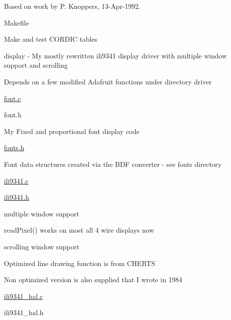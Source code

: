 \begin{DoxyItemize}
\begin{DoxyItemize}
\begin{DoxyItemize}
\begin{DoxyItemize}
\item Based on work by P. Knoppers, 13-\/\+Apr-\/1992.
\end{DoxyItemize}
\item Makefile
\begin{DoxyItemize}
\item Make and test C\+O\+R\+D\+IC tables
\end{DoxyItemize}
\end{DoxyItemize}
\end{DoxyItemize}
\item display -\/ My mostly rewritten ili9341 display driver with multiple window support and scrolling
\begin{DoxyItemize}
\item Depends on a few modified Adafruit functions under directory driver
\begin{DoxyItemize}
\item \hyperlink{font_8c}{font.\+c}
\item font.\+h
\begin{DoxyItemize}
\item My Fixed and proportional font display code
\end{DoxyItemize}
\item \hyperlink{fonts_8h}{fonts.\+h}
\begin{DoxyItemize}
\item Font data structures created via the B\+DF converter -\/ see fonts directory
\end{DoxyItemize}
\item \hyperlink{ili9341_8c}{ili9341.\+c}
\item \hyperlink{ili9341_8h}{ili9341.\+h}
\begin{DoxyItemize}
\item multiple window support
\item read\+Pixel() works on most all 4 wire displays now
\item scrolling window support
\item Optimized line drawing function is from C\+H\+E\+R\+TS
\begin{DoxyItemize}
\item Non optimized version is also supplied that I wrote in 1984
\end{DoxyItemize}
\end{DoxyItemize}
\item \hyperlink{ili9341__hal_8c}{ili9341\+\_\+hal.\+c}
\item ili9341\+\_\+hal.\+h
\begin{DoxyItemize}

\end{DoxyItemize}
\end{DoxyItemize}
\end{DoxyItemize}
\end{DoxyItemize}
